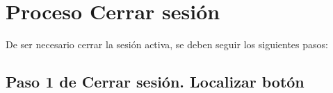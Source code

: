 \chapter{Proceso Cerrar sesión}
	De ser necesario cerrar la sesión activa, se deben seguir los
	siguientes pasos: 
\section{Paso 1 de Cerrar sesión. Localizar botón}
	

